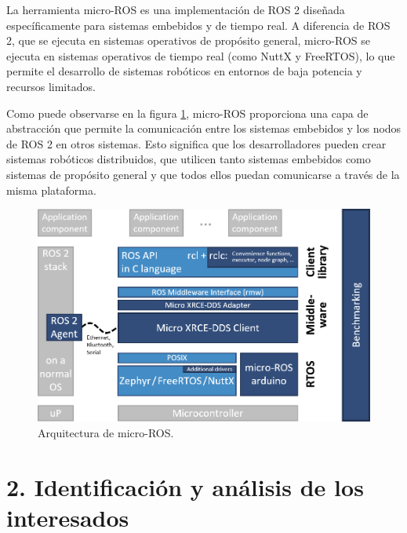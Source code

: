 \documentclass[
11pt, %
codirector, %
]{charter}
\begin{document}
La herramienta micro-ROS es una implementación de ROS 2 diseñada específicamente para sistemas embebidos y de tiempo real. A diferencia de ROS 2, que se ejecuta en sistemas operativos de propósito general, micro-ROS se ejecuta en sistemas operativos de tiempo real (como NuttX y FreeRTOS), lo que permite el desarrollo de sistemas robóticos en entornos de baja potencia y recursos limitados.

Como puede observarse en la figura \ref{fig:microROSarch}, micro-ROS proporciona una capa de abstracción que permite la comunicación entre los sistemas embebidos y los nodos de ROS 2 en otros sistemas.
Esto significa que los desarrolladores pueden crear sistemas robóticos distribuidos, que utilicen tanto sistemas embebidos como sistemas de propósito general y que todos ellos puedan comunicarse a través de la misma plataforma.

\begin{figure}[htpb]
\centering 
\includegraphics[width=.7\textwidth]{./Figuras/micro-ROS_architecture.png}
\caption{Arquitectura de micro-ROS.}
\label{fig:microROSarch}
\end{figure}

\section{2. Identificación y análisis de los interesados}
\label{sec:interesados}
\end{document}
